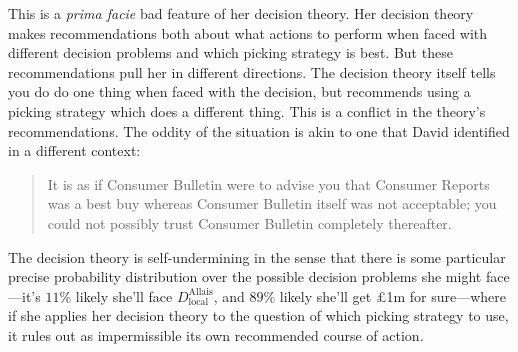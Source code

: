 \documentclass[a4paper]{article}
\newenvironment{CCM rewritten}
{\begingroup\color{blue}} %
{\endgroup}              %
\begin{document}
This is a \emph{prima facie} bad feature of her decision theory. Her decision theory makes recommendations both about what actions to perform when faced with different decision problems and which picking strategy is best. But these recommendations pull her in different directions. The decision theory itself tells you do do one thing when faced with the decision, but recommends using a picking strategy which does a different thing. 
This is a conflict in the theory's recommendations. The oddity of the situation is akin to one that David \citet[56]{lewis1971iim} identified in a different context:
\begin{quote}
	It is as if Consumer Bulletin were to advise you that Consumer Reports was a best
	buy whereas Consumer Bulletin itself was not acceptable; you could not possibly
	trust Consumer Bulletin completely thereafter.
\end{quote}

The decision theory is self-undermining in the sense that there is some particular precise probability distribution over the possible decision problems she might face---it's $11\%$ likely she'll face $D^{\mathrm{Allais}}_{\mathrm{local}}$, and $89\%$ likely she'll get \pounds 1m for sure---where if she applies her decision theory to the question of which picking strategy to use, it rules out as impermissible its own recommended course of action. 
\end{document}
